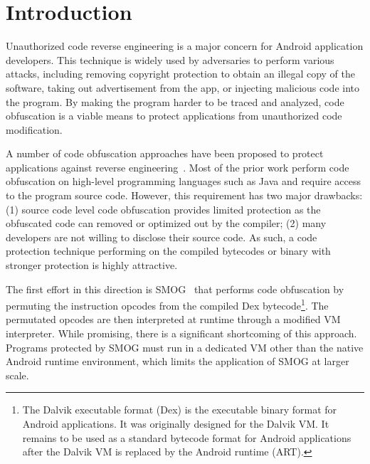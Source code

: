 \section{Introduction}

Unauthorized code reverse engineering is a major concern for Android
application developers. This technique is widely used by adversaries to
perform various attacks, including removing copyright protection to obtain an
illegal copy of the software, taking out advertisement from the app, or
injecting malicious code into the program. By making the program harder to be
traced and analyzed, code obfuscation is a viable means to
protect applications from unauthorized code modification.


A number of code obfuscation approaches have been proposed to protect
applications against reverse engineering~\cite{06,07,08,09}. Most of the
prior work perform code obfuscation on high-level programming languages such
as Java and require access to the program source code. However, this
requirement has two major drawbacks: (1) source code level code obfuscation
provides limited protection as the obfuscated code can removed or
optimized out by the compiler; (2) many developers are not willing to disclose
their source code.  As such, a code
protection technique performing on the compiled bytecodes or binary with stronger protection is highly attractive.


The first effort in this direction is SMOG~\cite{10} that performs code
obfuscation by permuting the instruction opcodes from the compiled Dex
bytecode\footnote{The Dalvik executable format (Dex) is the executable binary format for Android
applications. It was originally designed for the Dalvik VM. It
remains to be used as a standard bytecode format for Android applications after the Dalvik VM is replaced by the Android runtime (ART).}. The permutated opcodes are then
interpreted at runtime through a modified VM interpreter. While promising,
there is a significant shortcoming of this approach. Programs protected
by SMOG must run in a dedicated VM other than the native Android runtime 
environment, which limits the application of SMOG at larger scale.  


